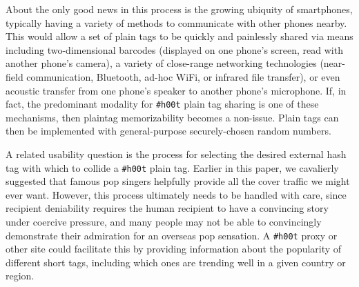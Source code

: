 \documentclass{sig-alternate-arxiv}
\newcommand{\hoot}{{\tt \#h00t}\xspace}
\begin{document}
About the only good news in this process is the growing ubiquity of smartphones, typically having a variety of methods to communicate with other phones nearby. This would allow a set of plain tags to be quickly and painlessly shared via means including two-dimensional barcodes (displayed on one phone's screen, read with another phone's camera), a variety of close-range networking technologies (near-field communication, Bluetooth, ad-hoc WiFi, or infrared file transfer), or even acoustic transfer from one phone's speaker to another phone's microphone. If, in fact, the predominant modality for \hoot plain tag sharing is one of these mechanisms, then plaintag memorizability becomes a non-issue. Plain tags can then be implemented with general-purpose securely-chosen random numbers.

A related usability question is the process for selecting the desired
external hash tag with which to collide a \hoot plain tag. Earlier in
this paper, we cavalierly suggested that famous pop singers helpfully
provide all the cover traffic we might ever want. However, this process
ultimately needs to be handled with care, since recipient deniability
requires the human recipient to have a convincing story under coercive
pressure, and many people may not be able to convincingly demonstrate
their admiration for an overseas pop sensation. A \hoot proxy or other
site could facilitate this by providing information about the popularity
of different short tags, including which ones are trending well in a
given country or region.

\end{document}

